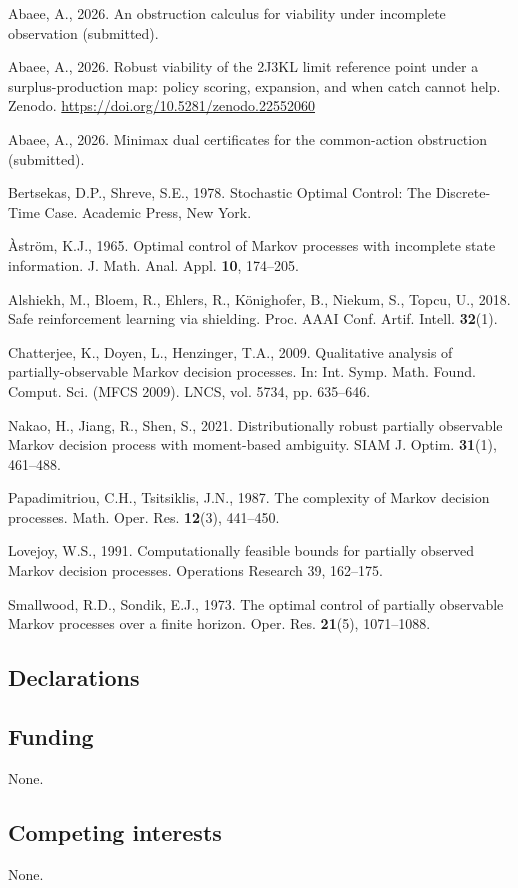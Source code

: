 \documentclass[10pt,twocolumn]{article}
\theoremstyle{plain}
\theoremstyle{definition}
\theoremstyle{remark}
\begin{document}
{\footnotesize
Abaee, A., 2026. An obstruction calculus for viability under incomplete
observation (submitted).

Abaee, A., 2026. Robust viability of the 2J3KL limit reference point
under a surplus-production map: policy scoring, expansion, and when
catch cannot help. Zenodo.
\url{https://doi.org/10.5281/zenodo.22552060}

Abaee, A., 2026. Minimax dual certificates for the common-action
obstruction (submitted).

Bertsekas, D.P., Shreve, S.E., 1978. Stochastic Optimal Control: The
Discrete-Time Case. Academic Press, New York.

\`{A}str\"{o}m, K.J., 1965. Optimal control of Markov processes with
incomplete state information. J. Math. Anal. Appl. \textbf{10},
174--205.

Alshiekh, M., Bloem, R., Ehlers, R., K\"{o}nighofer, B., Niekum, S.,
Topcu, U., 2018. Safe reinforcement learning via shielding. Proc. AAAI
Conf. Artif. Intell. \textbf{32}(1).

Chatterjee, K., Doyen, L., Henzinger, T.A., 2009. Qualitative analysis
of partially-observable Markov decision processes. In: Int. Symp. Math.
Found. Comput. Sci. (MFCS 2009). LNCS, vol. 5734, pp. 635--646.

Nakao, H., Jiang, R., Shen, S., 2021. Distributionally robust partially
observable Markov decision process with moment-based ambiguity. SIAM J.
Optim. \textbf{31}(1), 461--488.

Papadimitriou, C.H., Tsitsiklis, J.N., 1987. The complexity of Markov
decision processes. Math. Oper. Res. \textbf{12}(3), 441--450.

Lovejoy, W.S., 1991. Computationally feasible bounds for partially
observed Markov decision processes. Operations Research 39, 162--175.

Smallwood, R.D., Sondik, E.J., 1973. The optimal control of partially
observable Markov processes over a finite horizon. Oper. Res.
\textbf{21}(5), 1071--1088.
}

\subsection*{Declarations}

\subsection*{Funding}
None.

\subsection*{Competing interests}
None.
\end{document}
